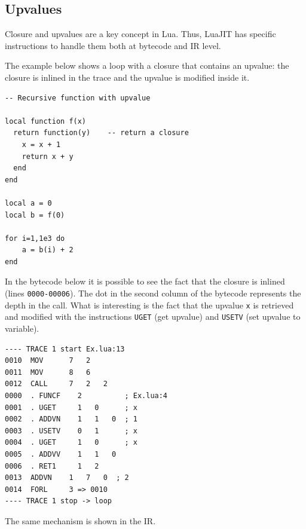 \subsection{Upvalues}
Closure and upvalues are a key concept in Lua. Thus, LuaJIT has specific instructions to handle them both at bytecode and IR level.

The example below shows a loop with a closure that contains an upvalue: the closure is inlined in the trace and the upvalue is modified inside it.
\begin{mdframed}[style=LuaStyleFrame]
\begin{lstlisting}[style=LuaStyle]
-- Recursive function with upvalue

local function f(x)
  return function(y)    -- return a closure
    x = x + 1
    return x + y
  end
end

local a = 0
local b = f(0)

for i=1,1e3 do
	a = b(i) + 2
end
\end{lstlisting}
\end{mdframed}

\noindent
In the bytecode below it is possible to see the fact that the closure is inlined (lines \texttt{0000-00006}). The dot in the second column of the bytecode represents the depth in the call. What is interesting is the fact that the upvalue \texttt{x} is retrieved and modified with the instructions \texttt{UGET} (get upvalue) and \texttt{USETV} (set upvalue to variable).

\begin{multicols}{2}
\begin{lstlisting}[style=DumpStyle]
---- TRACE 1 start Ex.lua:13
0010  MOV      7   2
0011  MOV      8   6
0012  CALL     7   2   2
0000  . FUNCF    2          ; Ex.lua:4
0001  . UGET     1   0      ; x
0002  . ADDVN    1   1   0  ; 1
0003  . USETV    0   1      ; x
0004  . UGET     1   0      ; x
0005  . ADDVV    1   1   0
0006  . RET1     1   2
0013  ADDVN    1   7   0  ; 2
0014  FORL     3 => 0010
---- TRACE 1 stop -> loop
\end{lstlisting}
\end{multicols}

\noindent
The same mechanism is shown in the IR.

